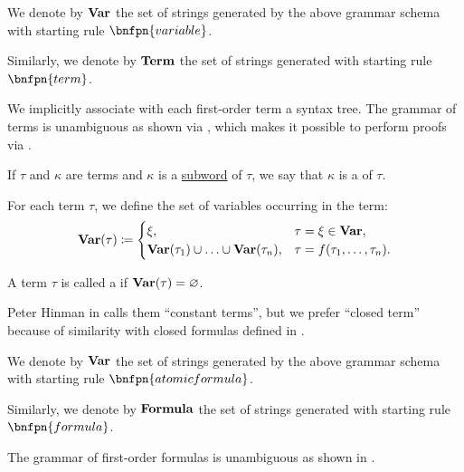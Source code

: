 \begin{definition}
\begin{thmenum}
     We denote by \( \operatorname{\mathbf{Var}} \) the set of strings generated by the above grammar schema with starting rule \( \bnfpn{variable} \).

     Similarly, we denote by \( \operatorname{\mathbf{Term}} \) the set of strings generated with starting rule \( \bnfpn{term} \).

    We implicitly associate with each first-order term a syntax tree. The grammar of terms is unambiguous as shown via , which makes it possible to perform proofs via .

     If \( \tau \) and \( \kappa \) are terms and \( \kappa \) is a \hyperref[def:formal_language/subword]{subword} of \( \tau \), we say that \( \kappa \) is a  of \( \tau \).

     For each term \( \tau \), we define the set of variables occurring in the term:
    \begin{equation}\label{eq:def:first_order_syntax/term_variables}
      \operatorname{\mathbf{Var}}(\tau) \coloneqq \begin{cases}
        \xi,                                                        &\tau = \xi \in \operatorname{\mathbf{Var}}, \\
        \operatorname{\mathbf{Var}}(\tau_1) \cup \ldots \cup \operatorname{\mathbf{Var}}(\tau_n), &\tau = f(\tau_1, \ldots, \tau_n).
      \end{cases}
    \end{equation}

     A term \( \tau \) is called a  if \( \operatorname{\mathbf{Var}}(\tau) = \varnothing \).

    Peter Hinman in \cite[def. 2.6.10]{Hinman2005} calls them \enquote{constant terms}, but we prefer \enquote{closed term} because of similarity with closed formulas defined in .

     We denote by \( \operatorname{\mathbf{Var}} \) the set of strings generated by the above grammar schema with starting rule \( \bnfpn{atomic formula} \).

     Similarly, we denote by \( \operatorname{\mathbf{Formula}} \) the set of strings generated with starting rule \( \bnfpn{formula} \).

    The grammar of first-order formulas is unambiguous as shown in .


\end{thmenum}
\end{definition}
